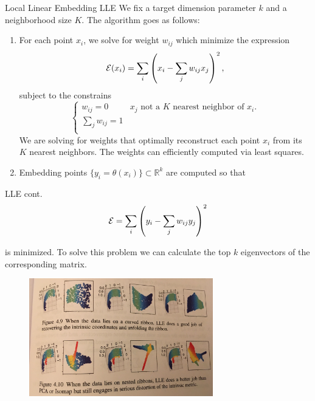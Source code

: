 \documentclass{beamer}
\begin{document}
\begin{frame}{Local Linear Embedding LLE}
	We fix a target dimension parameter $k$ and a neighborhood size $K$. The algorithm goes as follows:
	\begin{enumerate}
		\item For each point $x_i$, we solve for weight $w_{ij}$ which minimize the expression
		\begin{equation*}
			{\cal E}(x_i)= \sum_i \left( x_i - \sum_j w_{ij} x_j \right)^2, 
		\end{equation*}
		subject to the constrains
		\begin{equation*}
			\begin{cases}
				w_{ij}=0 & \text{$x_j$ not a $K$ nearest neighbor of $x_i$}.\\
				\sum_j w_{ij}=1 & \\
			\end{cases}
		\end{equation*}
	We are solving for weights that optimally reconstruct each point $x_i$ from its $K$ nearest neighbors. The weights can efficiently computed via least squares.
	\item Embedding points $\{ y_i = \theta(x_i)\} \subset \mathbb{R}^k$ are computed so that

	\end{enumerate}
\end{frame}

\begin{frame}{LLE cont.}
		\begin{equation*}
		{\cal E}= \sum_i \left( y_i - \sum_j w_{ij}y_j \right)^2
	\end{equation*}

		is minimized. To solve this problem we can calculate the top $k$ eigenvectors of the corresponding matrix. 
	\begin{figure}[h]
	\centering
	\includegraphics[width=8cm]{../../Figures/fig_manifolde_4_10.jpg}
\end{figure}			
		
\end{frame}
\end{document}
